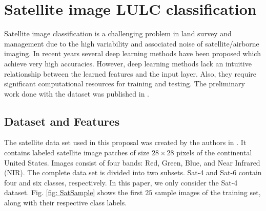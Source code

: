 \documentclass[11pt]{article}
\begin{document}
\section{Satellite image LULC classification}

Satellite image classification is a challenging problem in land survey and management due to the high variability and associated noise of satellite/airborne imaging. In recent years several deep learning methods have been proposed which achieve very high accuracies. However, deep learning methods lack an intuitive relationship between the learned features and the input layer. Also, they require significant computational resources for training and testing. The preliminary work done with the dataset was published in \cite{Liyanage2020}.

\subsection{Dataset and Features}

The satellite data set used in this proposal was created by the authors in \cite{Basu2015}. It contains labeled satellite image patches of size $28\times28$ pixels of the continental United States. Images consist of four bands: Red, Green, Blue, and Near Infrared (NIR). The complete data set is divided into two subsets. Sat-4 and Sat-6 contain four and six classes, respectively. In this paper, we only consider the Sat-4 dataset. Fig. \ref{fig: SatSample} shows the first $25$ sample images of the training set, along with their respective class labels.

\end{document}
